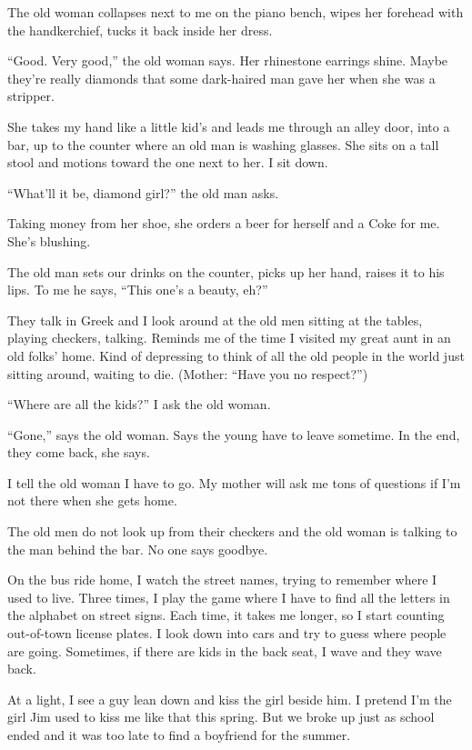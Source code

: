 \documentclass[twoside,10pt]{book}
\begin{document}
The old woman collapses next to me on the piano bench, wipes her
forehead with the hand­kerchief, tucks it back inside her dress.

``Good. Very good,'' the old woman says. Her rhinestone earrings shine.
Maybe they're really diamonds that some dark-haired man gave her when
she was a stripper.

She takes my hand like a little kid's and leads me through an alley
door, into a bar, up to the counter where an old man is washing glasses.
She sits on a tall stool and motions toward the one next to her. I sit
down.

``What'll it be, diamond girl?'' the old man asks.

Taking money from her shoe, she orders a beer for herself and a Coke for
me. She's blushing.

The old man sets our drinks on the counter, picks up her hand, raises it
to his lips. To me he says, ``This one's a beauty, eh?''

They talk in Greek and I look around at the old men sitting at the
tables, playing checkers, talking. Reminds me of the time I visited my
great aunt in an old folks' home. Kind of depressing to think of all the
old people in the world just sitting around, waiting to die. (Mother:
``Have you no respect?'')

``Where are all the kids?'' I ask the old woman.

``Gone,'' says the old woman. Says the young have to leave sometime. In
the end, they come back, she says.

I tell the old woman I have to go. My mother will ask me tons of
questions if I'm not there when she gets home.

The old men do not look up from their checkers and the old woman is
talking to the man behind the bar. No one says goodbye.

On the bus ride home, I watch the street names, trying to remember where
I used to live. Three times, I play the game where I have to find all
the letters in the alphabet on street signs. Each time, it takes me
longer, so I start counting out-of-town license plates. I look down into
cars and try to guess where people are going. Sometimes, if there are
kids in the back seat, I wave and they wave back.

At a light, I see a guy lean down and kiss the girl beside him. I
pretend I'm the girl Jim used to kiss me like that this spring. But we
broke up just as school ended and it was too late to find a boyfriend
for the summer.
\end{document}
